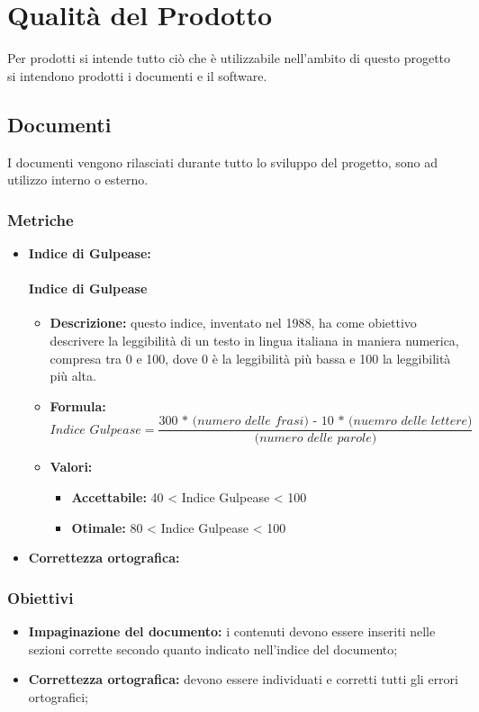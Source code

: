 \section{Qualità del Prodotto}
Per prodotti si intende tutto ciò che è utilizzabile nell'ambito di questo progetto si intendono prodotti i documenti e il software.

\subsection{Documenti}
I documenti vengono rilasciati durante tutto lo sviluppo del progetto, sono ad utilizzo interno o esterno.

\subsubsection{Metriche}
\begin{itemize}
    \item \textbf{Indice di Gulpease:}
    \paragraph{Indice di Gulpease}
\begin{itemize}
\item \textbf{Descrizione:} questo indice, inventato nel 1988, ha come obiettivo descrivere la leggibilità di un testo in lingua italiana in maniera numerica, compresa tra 0 e 100, dove 0 è la leggibilità più bassa e 100 la leggibilità più alta. 
\item \textbf{Formula:} \[\textit{Indice Gulpease} = \frac{\textit{300 * (numero delle frasi) - 10 * (nuemro delle lettere)}}{\textit{(numero delle parole)}}\]
\item \textbf{Valori:}
    \begin{itemize}
        \item \textbf{Accettabile:} 40 < Indice Gulpease < 100
        \item \textbf{Otimale:} 80 < Indice Gulpease < 100
    \end{itemize}
\end{itemize}
    \item \textbf{Correttezza ortografica:}
\end{itemize}

\subsubsection{Obiettivi}
\begin{itemize}
    \item \textbf{Impaginazione del documento:} i contenuti devono essere inseriti nelle sezioni corrette secondo quanto indicato nell'indice del documento;
    \item \textbf{Correttezza ortografica:} devono essere individuati e corretti tutti gli errori ortografici;
\end{itemize}

